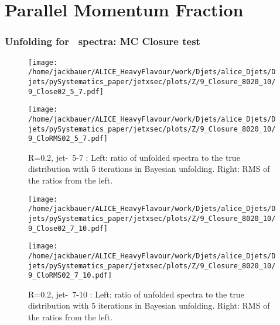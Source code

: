 \FloatBarrier
\pagebreak
\part{Parallel Momentum Fraction}

\section{Unfolding for \zch\ spectra: MC Closure test}
\label{sect:unfResults_zchClosure}

\begin{figure}
\centering
\begin{minipage}{.5\textwidth}
  \centering
  \texttt{[image: /home/jackbauer/ALICE\_HeavyFlavour/work/Djets/alice\_Djets/Djets/pySystematics\_paper/jetxsec/plots/Z/9\_Closure\_8020\_10/9\_Close02\_5\_7.pdf]}
\end{minipage}%
\begin{minipage}{.5\textwidth}
  \centering
  \texttt{[image: /home/jackbauer/ALICE\_HeavyFlavour/work/Djets/alice\_Djets/Djets/pySystematics\_paper/jetxsec/plots/Z/9\_Closure\_8020\_10/9\_CloRMS02\_5\_7.pdf]}
\end{minipage}
  \caption{R=0.2, jet-\pt\ 5-7 \GeVc: Left: ratio of unfolded spectra to the true distribution with 5 iterations in Bayesian unfolding. Right: RMS of the ratios from the left.}
  \label{fig:UnfClosZchR02_5_7}
\end{figure}
\begin{figure}
\centering
\begin{minipage}{.5\textwidth}
  \centering
  \texttt{[image: /home/jackbauer/ALICE\_HeavyFlavour/work/Djets/alice\_Djets/Djets/pySystematics\_paper/jetxsec/plots/Z/9\_Closure\_8020\_10/9\_Close02\_7\_10.pdf]}
\end{minipage}%
\begin{minipage}{.5\textwidth}
  \centering
  \texttt{[image: /home/jackbauer/ALICE\_HeavyFlavour/work/Djets/alice\_Djets/Djets/pySystematics\_paper/jetxsec/plots/Z/9\_Closure\_8020\_10/9\_CloRMS02\_7\_10.pdf]}
\end{minipage}
  \caption{R=0.2, jet-\pt\ 7-10 \GeVc: Left: ratio of unfolded spectra to the true distribution with 5 iterations in Bayesian unfolding. Right: RMS of the ratios from the left.}
  \label{fig:UnfClosZchR02_7_10}
\end{figure}
